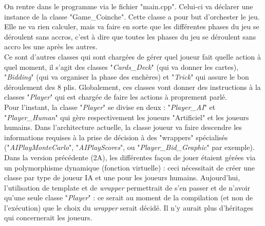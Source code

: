 \documentclass[a4paper,11pt]{article}
\begin{document}
On rentre dans le programme via le fichier "main.cpp". Celui-ci va déclarer une instance de la classe "Game\_Coinche". Cette classe a pour but d'orchester le jeu. Elle ne va rien calculer, mais va faire en sorte que les différentes phases du jeu se déroulent sans accros, c'est à dire que toutes les phases du jeu se déroulent sans accro les une après les autres. \\

Ce sont d'autres classes qui sont chargées de gérer quel joueur fait quelle action à quel moment, il s'agit des classes "\textit{Cards\_Deck}" (qui va donner les cartes), "\textit{Bidding}" (qui va organiser la phase des enchères) et "\textit{Trick}" qui assure le bon déroulement des 8 plis. Globalement, ces classes vont donner des instructions à la classes "\textit{Player}" qui est chargée de faire les actions à proprement parlé. \\

Pour l'instant, la classe "\textit{Player}" se divise en deux : "\textit{Player\_AI}" et "\textit{Player\_Human}" qui gère respectivement les joueurs "Artificiel" et les joueurs humains. Dans l'architecture actuelle, la classe joueur va faire descendre les informations requises à la prise de décision à des "wrappers" spécialisés ("\textit{AIPlayMonteCarlo}", "\textit{AIPlayScores}", ou "\textit{Player\_Bid\_Graphic}" par exemple). Dans la version précédente (2A), les différentes façon de jouer étaient gérées via un polymorphisme dynamique (fonction virtuelle) : ceci nécessitait de créer une classe par type de joueur IA et une pour les joueurs humains. Aujourd'hui, l'utilisation de template et de \textit{wrapper} permettrait de s'en passer et de n'avoir qu'une seule classe "\textit{Player}" : ce serait au moment de la compilation (et non de l'exécution) que le choix du \textit{wrapper} serait décidé. Il n'y aurait plus d'héritages qui concernerait les joueurs. \\
\end{document}
